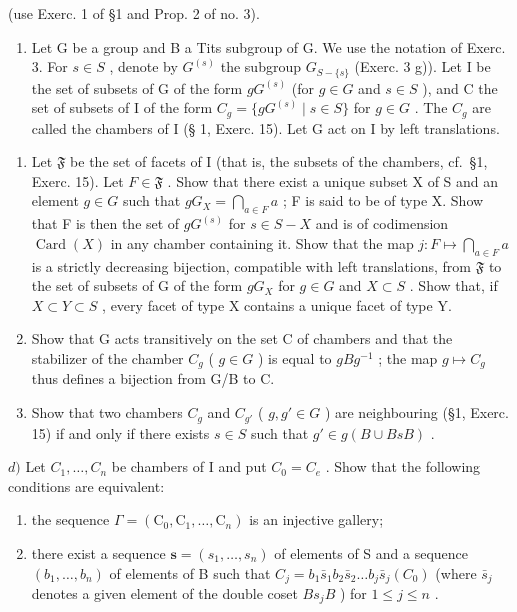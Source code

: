 (use Exerc. 1 of §1 and Prop. 2 of no. 3).

\begin{enumerate}
\def\labelenumi{\arabic{enumi})}
\setcounter{enumi}{9}
\tightlist
\item
  Let G be a group and B a Tits subgroup of G. We use the notation of Exerc. 3. For \(s \in S\) , denote by \(G^{(s)}\) the subgroup \(G_{S - \{s\}}\) (Exerc. 3 g)). Let I be the set of subsets of G of the form \(gG^{(s)}\) (for \(g \in G\) and \(s \in S\) ), and C the set of subsets of I of the form \(C_g = \{gG^{(s)} \mid s \in S\}\) for \(g \in G\) . The \(C_g\) are called the chambers of I (§ 1, Exerc. 15). Let G act on I by left translations.
\end{enumerate}

\begin{enumerate}
\def\labelenumi{\alph{enumi})}
\item
  Let \(\mathfrak{F}\) be the set of facets of I (that is, the subsets of the chambers, cf.~§1, Exerc. 15). Let \(F \in \mathfrak{F}\) . Show that there exist a unique subset X of S and an element \(g \in G\) such that \(gG_{X} = \bigcap_{a \in F} a\) ; F is said to be of type X. Show that F is then the set of \(gG^{(s)}\) for \(s \in S - X\) and is of codimension \(\operatorname{Card}(X)\) in any chamber containing it. Show that the map \(j: F \mapsto \bigcap_{a \in F} a\) is a strictly decreasing bijection, compatible with left translations, from \(\mathfrak{F}\) to the set of subsets of G of the form \(gG_{X}\) for \(g \in G\) and \(X \subset S\) . Show that, if \(X \subset Y \subset S\) , every facet of type X contains a unique facet of type Y.
\item
  Show that G acts transitively on the set C of chambers and that the stabilizer of the chamber \(C_{g}\) ( \(g \in G\) ) is equal to \(gBg^{-1}\) ; the map \(g \mapsto C_{g}\) thus defines a bijection from G/B to C.
\item
  Show that two chambers \(C_{g}\) and \(C_{g'}\) ( \(g, g' \in G\) ) are neighbouring (§1, Exerc. 15) if and only if there exists \(s \in S\) such that \(g' \in g(B \cup BsB)\) .
\end{enumerate}

\(d)\) Let \(C_1, \ldots, C_n\) be chambers of I and put \(C_0 = C_e\) . Show that the following conditions are equivalent:

\begin{enumerate}
\def\labelenumi{(\roman{enumi})}
\item
  the sequence \(\Gamma = (\mathrm{C}_0, \mathrm{C}_1, \ldots, \mathrm{C}_n)\) is an injective gallery;
\item
  there exist a sequence \(\mathbf{s} = (s_1, \ldots, s_n)\) of elements of S and a sequence \((b_1, \ldots, b_n)\) of elements of B such that \(C_j = b_1 \bar{s}_1 b_2 \bar{s}_2 \ldots b_j \bar{s}_j (C_0)\) (where \(\bar{s}_j\) denotes a given element of the double coset \(Bs_jB\) ) for \(1 \leqslant j \leqslant n\) .
\end{enumerate}

